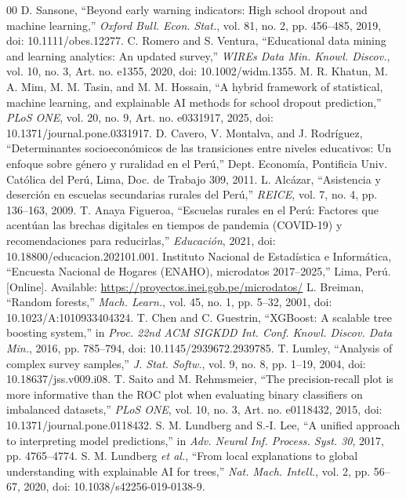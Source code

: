 \documentclass[conference]{IEEEtran}
\begin{document}
\begin{thebibliography}{00}
 D. Sansone, ``Beyond early warning indicators: High school dropout and machine learning,'' \textit{Oxford Bull. Econ. Stat.}, vol. 81, no. 2, pp. 456--485, 2019, doi: 10.1111/obes.12277.
 C. Romero and S. Ventura, ``Educational data mining and learning analytics: An updated survey,'' \textit{WIREs Data Min. Knowl. Discov.}, vol. 10, no. 3, Art. no. e1355, 2020, doi: 10.1002/widm.1355.
 M. R. Khatun, M. A. Mim, M. M. Tasin, and M. M. Hossain, ``A hybrid framework of statistical, machine learning, and explainable AI methods for school dropout prediction,'' \textit{PLoS ONE}, vol. 20, no. 9, Art. no. e0331917, 2025, doi: 10.1371/journal.pone.0331917.
 D. Cavero, V. Montalva, and J. Rodríguez, ``Determinantes socioeconómicos de las transiciones entre niveles educativos: Un enfoque sobre género y ruralidad en el Perú,'' Dept. Economía, Pontificia Univ. Católica del Perú, Lima, Doc. de Trabajo 309, 2011.
 L. Alcázar, ``Asistencia y deserción en escuelas secundarias rurales del Perú,'' \textit{REICE}, vol. 7, no. 4, pp. 136--163, 2009.
 T. Anaya Figueroa, ``Escuelas rurales en el Perú: Factores que acentúan las brechas digitales en tiempos de pandemia (COVID-19) y recomendaciones para reducirlas,'' \textit{Educación}, 2021, doi: 10.18800/educacion.202101.001.
 Instituto Nacional de Estadística e Informática, ``Encuesta Nacional de Hogares (ENAHO), microdatos 2017--2025,'' Lima, Perú. [Online]. Available: \url{https://proyectos.inei.gob.pe/microdatos/}
 L. Breiman, ``Random forests,'' \textit{Mach. Learn.}, vol. 45, no. 1, pp. 5--32, 2001, doi: 10.1023/A:1010933404324.
 T. Chen and C. Guestrin, ``XGBoost: A scalable tree boosting system,'' in \textit{Proc. 22nd ACM SIGKDD Int. Conf. Knowl. Discov. Data Min.}, 2016, pp. 785--794, doi: 10.1145/2939672.2939785.
 T. Lumley, ``Analysis of complex survey samples,'' \textit{J. Stat. Softw.}, vol. 9, no. 8, pp. 1--19, 2004, doi: 10.18637/jss.v009.i08.
 T. Saito and M. Rehmsmeier, ``The precision-recall plot is more informative than the ROC plot when evaluating binary classifiers on imbalanced datasets,'' \textit{PLoS ONE}, vol. 10, no. 3, Art. no. e0118432, 2015, doi: 10.1371/journal.pone.0118432.
 S. M. Lundberg and S.-I. Lee, ``A unified approach to interpreting model predictions,'' in \textit{Adv. Neural Inf. Process. Syst. 30}, 2017, pp. 4765--4774.
 S. M. Lundberg \textit{et al.}, ``From local explanations to global understanding with explainable AI for trees,'' \textit{Nat. Mach. Intell.}, vol. 2, pp. 56--67, 2020, doi: 10.1038/s42256-019-0138-9.
\end{thebibliography}
\end{document}
